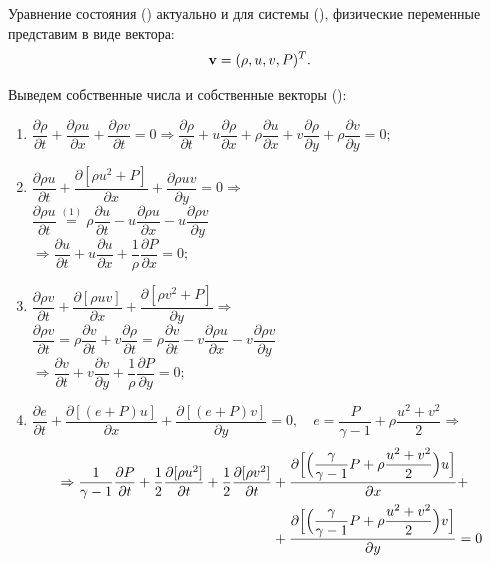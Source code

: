 \documentclass[12pt,a4paper]{article}
\newcommand{\dhalf}{\dfrac{1}{2}}
\newcommand{\dpartial}[2]{\dfrac{ \partial #1 }{ \partial #2 }}
\begin{document}
        Уравнение состояния () актуально и для системы (), физические переменные представим в виде вектора:
        \begin{equation}
            \label{var2d:phys}
            \bold v = (\rho, u, v, P)^T.
        \end{equation}

        \pagebreak

        Выведем собственные числа и собственные векторы ():

        \begin{enumerate}
            \item $ \dpartial{\rho}{t} + \dpartial{\rho u}{x} + \dpartial{\rho v}{t} = 0 \Rightarrow \dpartial{\rho}{t} + u \dpartial{\rho}{x} + \rho \dpartial{u}{x} + v \dpartial{\rho}{y} + \rho \dpartial{v}{y} = 0; $ \\[0.7em]
            
            \item $ \dpartial{\rho u}{t} + \dpartial{[\rho u^2 + P]}{x} + \dpartial{\rho u v}{y} = 0 \Rightarrow $ \\[3mm]
            $ \dpartial{\rho u}{t} \overset{(1)}{=} \rho \dpartial{u}{t} - u \dpartial{\rho u}{x} - u \dpartial{\rho v}{y} $ \\[3mm]
            $ \Rightarrow \dpartial{u}{t} + u \dpartial{u}{x} + \dfrac{1}{\rho} \dpartial{P}{x} = 0; $ \\[0.7em]

            \item $ \dpartial{\rho v}{t} + \dpartial{ [\rho u v]}{x} + \dpartial{[\rho v^2 + P]}{y} \Rightarrow $ \\[3mm]
            $ \dpartial{\rho v}{t} = \rho \dpartial{v}{t} + v \dpartial{\rho}{t} = \rho \dpartial{v}{t} - v \dpartial{\rho u}{x} - v \dpartial{\rho v}{y} $ \\[3mm]
            $ \Rightarrow \dpartial{v}{t} + v \dpartial{v}{y} + \dfrac{1}{\rho} \dpartial{P}{y} = 0; $ \\[0.7em]

            \item $ \dpartial{e}{t} + \dpartial{[(e + P) u]}{x} + \dpartial{[(e + P) v]}{y} = 0, \quad e = \dfrac{P}{\gamma - 1} + \rho \dfrac{u^2 + v^2}{2} \Rightarrow $ \\[3mm]
            \[
                \begin{split}
                    \Rightarrow \dfrac{1}{\gamma - 1} \dpartial{P}{t} + \dhalf \dpartial{[\rho u^2]}{t} + \dhalf \dpartial{[\rho v^2]}{t} &+ \dpartial{\Bigl[ \Bigl( \dfrac{\gamma}{\gamma - 1} P + \rho \dfrac{u^2 + v^2}{2} \Bigr) u \Bigr]}{x} + \\
                    & + \dpartial{\Bigl[ \Bigl( \dfrac{\gamma}{\gamma - 1} P + \rho \dfrac{u^2 + v^2}{2} \Bigr) v \Bigr]}{y} = 0
                \end{split}  
            \]


\end{enumerate}
\end{document}
